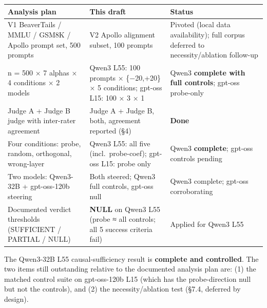 \documentclass[
]{article}
\newcounter{none} %
\begin{document}
{\def\LTcaptype{none} %
\begin{longtable}[]{@{}
  >{\raggedright\arraybackslash}p{}
  >{\raggedright\arraybackslash}p{}
  >{\raggedright\arraybackslash}p{}@{}}
\toprule\noalign{}
\begin{minipage}[b]{\linewidth}\raggedright
Analysis plan
\end{minipage} & \begin{minipage}[b]{\linewidth}\raggedright
This draft
\end{minipage} & \begin{minipage}[b]{\linewidth}\raggedright
Status
\end{minipage} \\
\midrule\noalign{}
\endhead
\bottomrule\noalign{}
\endlastfoot
V1 BeaverTails / MMLU / GSM8K / Apollo prompt set, 500 prompts & V2
Apollo alignment subset, 100 prompts & Pivoted (local data
availability); full corpus deferred to necessity/ablation follow-up \\
n = 500 × 7 alphas × 4 conditions × 2 models & Qwen3 L55: 100 prompts ×
\{−20,+20\} × 5 conditions; gpt-oss L15: 100 × 3 × 1 & Qwen3
\textbf{complete with full controls}; gpt-oss probe-only \\
Judge A + Judge B judge with inter-rater agreement & Judge A + Judge B,
both, agreement reported (§4) & \textbf{Done} \\
Four conditions: probe, random, orthogonal, wrong-layer & Qwen3 L55: all
five (incl.~probe-coef); gpt-oss L15: probe only & Qwen3
\textbf{complete}; gpt-oss controls pending \\
Two models: Qwen3-32B + gpt-oss-120b steering & Both steered; Qwen3 full
controls, gpt-oss null & Qwen3 complete; gpt-oss corroborating \\
Documented verdict thresholds (SUFFICIENT / PARTIAL / NULL) &
\textbf{NULL} on Qwen3 L55 (probe ≈ all controls; all 5 success criteria
fail) & Applied for Qwen3 L55 \\
\end{longtable}
}

The Qwen3-32B L55 causal-sufficiency result is \textbf{complete and
controlled}. The two items still outstanding relative to the documented
analysis plan are: (1) the matched control suite on gpt-oss-120b L15
(which has the probe-direction null but not the controls), and (2) the
necessity/ablation test (§7.4, deferred by design).
\end{document}
